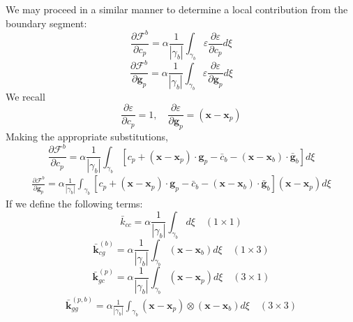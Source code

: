 \documentclass[11pt]{article} %
\begin{document}
We may proceed in a similar manner to determine a local contribution from the boundary segment:
\begin{equation}
	\frac{\partial \mathcal{F}^b}{\partial c_p} = \alpha \frac{1}{| \gamma_b |} \int_{\gamma_b} \varepsilon \frac{\partial \varepsilon}{\partial c_p} d \xi
\end{equation}
\begin{equation}
	\frac{\partial \mathcal{F}^b}{\partial \mathbf{g}_p} = \alpha \frac{1}{| \gamma_b |} \int_{\gamma_b} \varepsilon \frac{\partial \varepsilon}{\partial \mathbf{g}_p} d \xi
\end{equation}
We recall
\begin{equation}
	\frac{\partial \varepsilon}{\partial c_p} = 1, \quad \frac{\partial \varepsilon}{\partial \mathbf{g}_p} = (\mathbf{x} - \mathbf{x}_p)
\end{equation}
Making the appropriate substitutions,
\begin{equation}
	\frac{\partial \mathcal{F}^b}{\partial c_p} = \alpha \frac{1}{| \gamma_b |} \int_{\gamma_b} \left[ c_p + (\mathbf{x} - \mathbf{x}_p) \cdot \mathbf{g}_p - \bar{c}_b - (\mathbf{x} - \mathbf{x}_b) \cdot \bar{\mathbf{g}}_b \right] d \xi
\end{equation}
\begin{eqnarray}
	\frac{\partial \mathcal{F}^b}{\partial \mathbf{g}_p} = \alpha \frac{1}{| \gamma_b |} \int_{\gamma_b} \left[ c_p + (\mathbf{x} - \mathbf{x}_p) \cdot \mathbf{g}_p - \bar{c}_b - (\mathbf{x} - \mathbf{x}_b) \cdot \bar{\mathbf{g}}_b \right] (\mathbf{x} - \mathbf{x}_p) d \xi
\end{eqnarray}
If we define the following terms:
\begin{equation}
	\bar{k}_{cc} = \alpha \frac{1}{| \gamma_b |} \int_{\gamma_b} d \xi \quad (1 \times 1)
\end{equation}
\begin{equation}
	\bar{\mathbf{k}}_{cg}^{(b)} = \alpha \frac{1}{| \gamma_b |} \int_{\gamma_b} (\mathbf{x} - \mathbf{x}_b) d \xi \quad (1 \times 3)
\end{equation}
\begin{equation}
	\bar{\mathbf{k}}_{gc}^{(p)} = \alpha \frac{1}{| \gamma_b |} \int_{\gamma_b} (\mathbf{x} - \mathbf{x}_p) d \xi \quad (3 \times 1)
\end{equation}
\begin{eqnarray}
	\bar{\mathbf{k}}_{gg}^{(p,b)} = \alpha \frac{1}{| \gamma_b |} \int_{\gamma_b} (\mathbf{x} - \mathbf{x}_p) \otimes (\mathbf{x} - \mathbf{x}_b) d \xi \quad (3 \times 3)
\end{eqnarray}
\end{document}
